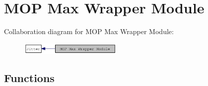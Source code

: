 \hypertarget{group__maxmopmod}{
\section{MOP Max Wrapper Module}
\label{group__maxmopmod}
}


Collaboration diagram for MOP Max Wrapper Module:\nopagebreak
\begin{figure}[H]
\begin{center}
\leavevmode
\includegraphics[width=140pt]{group__maxmopmod}
\end{center}
\end{figure}
\subsection*{Functions}
